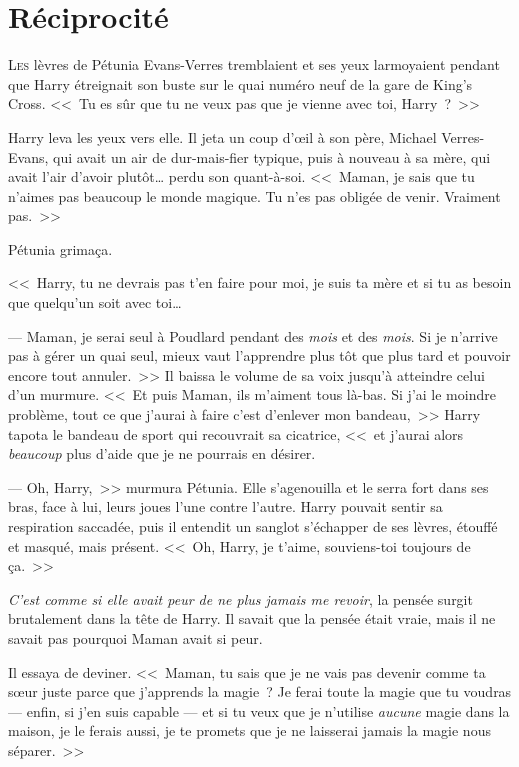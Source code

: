 \chapter{Réciprocité}

\lettrine{L}{es} lèvres de Pétunia Evans-Verres tremblaient et ses yeux larmoyaient pendant que Harry étreignait son buste sur le quai numéro neuf de la gare de King's Cross. <<~Tu es sûr que tu ne veux pas que je vienne avec toi, Harry~?~>>

Harry leva les yeux vers elle. Il jeta un coup d'œil à son père, Michael Verres-Evans, qui avait un air de dur-mais-fier typique, puis à nouveau à sa mère, qui avait l'air d'avoir plutôt… perdu son quant-à-soi. <<~Maman, je sais que tu n'aimes pas beaucoup le monde magique. Tu n'es pas obligée de venir. Vraiment pas.~>>

Pétunia grimaça.

<<~Harry, tu ne devrais pas t'en faire pour moi, je suis ta mère et si tu as besoin que quelqu'un soit avec toi…

--- Maman, je serai seul à Poudlard pendant des \emph{mois} et des \emph{mois}. Si je n'arrive pas à gérer un quai seul, mieux vaut l'apprendre plus tôt que plus tard et pouvoir encore tout annuler.~>> Il baissa le volume de sa voix jusqu'à atteindre celui d'un murmure. <<~Et puis Maman, ils m'aiment tous là-bas. Si j'ai le moindre problème, tout ce que j'aurai à faire c'est d'enlever mon bandeau,~>> Harry tapota le bandeau de sport qui recouvrait sa cicatrice, <<~et j'aurai alors \emph{beaucoup} plus d'aide que je ne pourrais en désirer.

--- Oh, Harry,~>> murmura Pétunia. Elle s'agenouilla et le serra fort dans ses bras, face à lui, leurs joues l'une contre l'autre. Harry pouvait sentir sa respiration saccadée, puis il entendit un sanglot s'échapper de ses lèvres, étouffé et masqué, mais présent. <<~Oh, Harry, je t'aime, souviens-toi toujours de ça.~>>

\emph{C'est comme si elle avait peur de ne plus jamais me revoir}, la pensée surgit brutalement dans la tête de Harry. Il savait que la pensée était vraie, mais il ne savait pas pourquoi Maman avait si peur.

Il essaya de deviner. <<~Maman, tu sais que je ne vais pas devenir comme ta sœur juste parce que j'apprends la magie~? Je ferai toute la magie que tu voudras — enfin, si j'en suis capable — et si tu veux que je n'utilise \emph{aucune} magie dans la maison, je le ferais aussi, je te promets que je ne laisserai jamais la magie nous séparer.~>>


